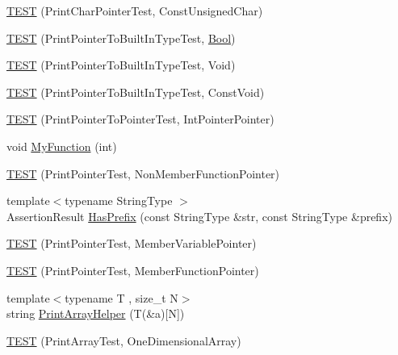 \begin{DoxyCompactItemize}
\item 
\hyperlink{namespacetesting_1_1gtest__printers__test_aa0487f8fd5052f7d6afe2b18ad7931f9}{\-T\-E\-S\-T} (\-Print\-Char\-Pointer\-Test, \-Const\-Unsigned\-Char)
\item 
\hyperlink{namespacetesting_1_1gtest__printers__test_ad08dcd672b1e66a802a564eb974c400a}{\-T\-E\-S\-T} (\-Print\-Pointer\-To\-Built\-In\-Type\-Test, \hyperlink{structBool}{\-Bool})
\item 
\hyperlink{namespacetesting_1_1gtest__printers__test_ac6d8b84db9386b399eb431b5b1668e87}{\-T\-E\-S\-T} (\-Print\-Pointer\-To\-Built\-In\-Type\-Test, \-Void)
\item 
\hyperlink{namespacetesting_1_1gtest__printers__test_a8819fb42392faae72e8bc594d498085d}{\-T\-E\-S\-T} (\-Print\-Pointer\-To\-Built\-In\-Type\-Test, \-Const\-Void)
\item 
\hyperlink{namespacetesting_1_1gtest__printers__test_afee54807b15b623718c62008bd743d4b}{\-T\-E\-S\-T} (\-Print\-Pointer\-To\-Pointer\-Test, \-Int\-Pointer\-Pointer)
\item 
void \hyperlink{namespacetesting_1_1gtest__printers__test_adf0e590d6776ecb7095a989ff2272d7b}{\-My\-Function} (int)
\item 
\hyperlink{namespacetesting_1_1gtest__printers__test_aa3cb60cf6f3a4a0cd7d9873cd597ffd8}{\-T\-E\-S\-T} (\-Print\-Pointer\-Test, \-Non\-Member\-Function\-Pointer)
\item 
{\footnotesize template$<$typename String\-Type $>$ }\\\-Assertion\-Result \hyperlink{namespacetesting_1_1gtest__printers__test_abbd436200da6c80944c8a7504fb56ea1}{\-Has\-Prefix} (const \-String\-Type \&str, const \-String\-Type \&prefix)
\item 
\hyperlink{namespacetesting_1_1gtest__printers__test_a434cafcc1dbee409992bbb1593034480}{\-T\-E\-S\-T} (\-Print\-Pointer\-Test, \-Member\-Variable\-Pointer)
\item 
\hyperlink{namespacetesting_1_1gtest__printers__test_a9d998b210890d3d7e085d01c457f650f}{\-T\-E\-S\-T} (\-Print\-Pointer\-Test, \-Member\-Function\-Pointer)
\item 
{\footnotesize template$<$typename T , size\-\_\-t \-N$>$ }\\string \hyperlink{namespacetesting_1_1gtest__printers__test_a10300ded1e327c98c6a36beb7ad49e58}{\-Print\-Array\-Helper} (\-T(\&a)\mbox{[}\-N\mbox{]})
\item 
\hyperlink{namespacetesting_1_1gtest__printers__test_a3845c4717b03cb5ad309c7d9a37acb0a}{\-T\-E\-S\-T} (\-Print\-Array\-Test, \-One\-Dimensional\-Array)

\end{DoxyCompactItemize}
